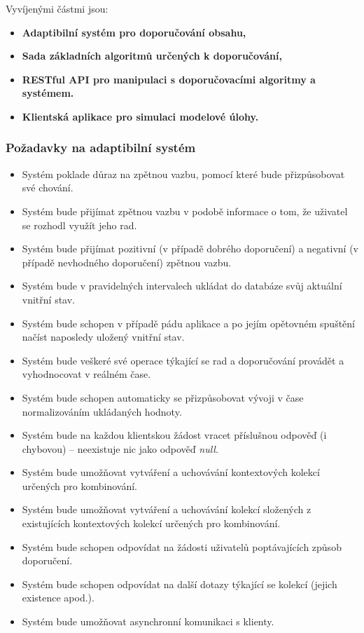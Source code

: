 \documentclass[thesis=M,czech]{FITthesis}[2014/05/07]
\begin{document}
Vyvíjenými částmi jsou:

\begin{itemize}
  \item \textbf{Adaptibilní systém pro doporučování obsahu,}
  \item \textbf{Sada základních algoritmů určených k doporučování,}
  \item \textbf{RESTful API pro manipulaci s doporučovacími algoritmy a systémem.}
  \item \textbf{Klientská aplikace pro simulaci modelové úlohy.}    
\end{itemize}

\subsubsection{Požadavky na adaptibilní systém}

\begin{itemize}
	\item Systém poklade důraz na zpětnou vazbu, pomocí které bude přizpůsobovat své chování.
	\item Systém bude přijímat zpětnou vazbu v podobě informace o tom, že uživatel se rozhodl využít jeho rad.
	\item Systém bude přijímat pozitivní (v případě dobrého doporučení) a negativní (v případě nevhodného doporučení) zpětnou vazbu.
	\item Systém bude v pravidelných intervalech ukládat do databáze svůj aktuální vnitřní stav.
	\item Systém bude schopen v případě pádu aplikace a po jejím opětovném spuštění načíst naposledy uložený vnitřní stav.
	\item Systém bude veškeré své operace týkající se rad a doporučování provádět a vyhodnocovat v reálném čase.
	\item Systém bude schopen automaticky se přizpůsobovat vývoji v čase normalizováním ukládaných hodnoty.
	\item Systém bude na každou klientskou žádost vracet příslušnou odpověď (i chybovou) – neexistuje nic jako odpověď \emph{null}.	
	\item Systém bude umožňovat vytváření a uchovávání kontextových kolekcí určených pro kombinování.
	\item Systém bude umožňovat vytváření a uchovávání kolekcí složených z existujících kontextových kolekcí určených pro kombinování.	
	\item Systém bude schopen odpovídat na žádosti uživatelů poptávajících způsob doporučení.
	\item Systém bude schopen odpovídat na další dotazy týkající se kolekcí (jejich existence apod.).	
	\item Systém bude umožňovat asynchronní komunikaci s klienty.
\end{itemize}
\end{document}
